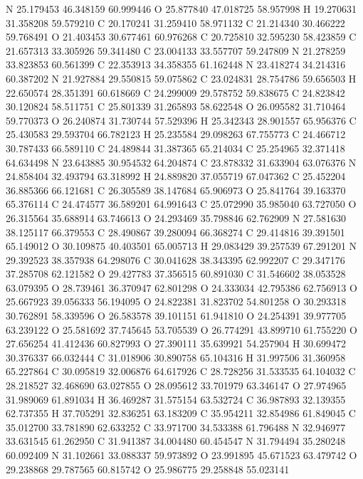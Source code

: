 \documentclass{article}
\begin{document}
N 25.179453 46.348159 60.999446 
O 25.877840 47.018725 58.957998 
H 19.270631 31.358208 59.579210 
C 20.170241 31.259410 58.971132 
C 21.214340 30.466222 59.768491 
O 21.403453 30.677461 60.976268 
C 20.725810 32.595230 58.423859 
C 21.657313 33.305926 59.341480 
C 23.004133 33.557707 59.247809 
N 21.278259 33.823853 60.561399 
C 22.353913 34.358355 61.162448 
N 23.418274 34.214316 60.387202 
N 21.927884 29.550815 59.075862 
C 23.024831 28.754786 59.656503 
H 22.650574 28.351391 60.618669 
C 24.299009 29.578752 59.838675 
C 24.823842 30.120824 58.511751 
C 25.801339 31.265893 58.622548 
O 26.095582 31.710464 59.770373 
O 26.240874 31.730744 57.529396 
H 25.342343 28.901557 65.956376 
C 25.430583 29.593704 66.782123 
H 25.235584 29.098263 67.755773 
C 24.466712 30.787433 66.589110 
C 24.489844 31.387365 65.214034 
C 25.254965 32.371418 64.634498 
N 23.643885 30.954532 64.204874 
C 23.878332 31.633904 63.076376 
N 24.858404 32.493794 63.318992 
H 24.889820 37.055719 67.047362 
C 25.452204 36.885366 66.121681 
C 26.305589 38.147684 65.906973 
O 25.841764 39.163370 65.376114 
C 24.474577 36.589201 64.991643 
C 25.072990 35.985040 63.727050 
O 26.315564 35.688914 63.746613 
O 24.293469 35.798846 62.762909 
N 27.581630 38.125117 66.379553 
C 28.490867 39.280094 66.368274 
C 29.414816 39.391501 65.149012 
O 30.109875 40.403501 65.005713 
H 29.083429 39.257539 67.291201 
N 29.392523 38.357938 64.298076 
C 30.041628 38.343395 62.992207 
C 29.347176 37.285708 62.121582 
O 29.427783 37.356515 60.891030 
C 31.546602 38.053528 63.079395 
O 28.739461 36.370947 62.801298 
O 24.333034 42.795386 62.756913 
O 25.667923 39.056333 56.194095 
O 24.822381 31.823702 54.801258 
O 30.293318 30.762891 58.339596 
O 26.583578 39.101151 61.941810 
O 24.254391 39.977705 63.239122 
O 25.581692 37.745645 53.705539 
O 26.774291 43.899710 61.755220 
O 27.656254 41.412436 60.827993 
O 27.390111 35.639921 54.257904 
H 30.699472 30.376337 66.032444 
C 31.018906 30.890758 65.104316 
H 31.997506 31.360958 65.227864 
C 30.095819 32.006876 64.617926 
C 28.728256 31.533535 64.104032 
C 28.218527 32.468690 63.027855 
O 28.095612 33.701979 63.346147 
O 27.974965 31.989069 61.891034 
H 36.469287 31.575154 63.532724 
C 36.987893 32.139355 62.737355 
H 37.705291 32.836251 63.183209 
C 35.954211 32.854986 61.849045 
C 35.012700 33.781890 62.633252 
C 33.971700 34.533388 61.796488 
N 32.946977 33.631545 61.262950 
C 31.941387 34.004480 60.454547 
N 31.794494 35.280248 60.092409 
N 31.102661 33.088337 59.973892 
O 23.991895 45.671523 63.479742 
O 29.238868 29.787565 60.815742 
O 25.986775 29.258848 55.023141 
\end{document}
